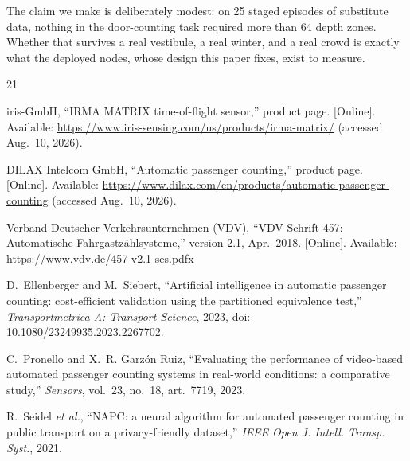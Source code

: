 \documentclass[conference]{IEEEtran}
\begin{document}
The claim we make is deliberately modest: on 25 staged episodes of substitute
data, nothing in the door-counting task required more than 64 depth zones.
Whether that survives a real vestibule, a real winter, and a real crowd is
exactly what the deployed nodes, whose design this paper fixes, exist to
measure.

\begin{thebibliography}{21}

iris-GmbH, ``IRMA MATRIX time-of-flight sensor,'' product page. [Online].
Available: \url{https://www.iris-sensing.com/us/products/irma-matrix/}
(accessed Aug.\ 10, 2026).

DILAX Intelcom GmbH, ``Automatic passenger counting,'' product page. [Online].
Available: \url{https://www.dilax.com/en/products/automatic-passenger-counting}
(accessed Aug.\ 10, 2026).

Verband Deutscher Verkehrsunternehmen (VDV), ``VDV-Schrift 457:
Automatische Fahrgastz\"ahlsysteme,'' version 2.1, Apr.\ 2018. [Online].
Available: \url{https://www.vdv.de/457-v2.1-ses.pdfx}

D.~Ellenberger and M.~Siebert, ``Artificial intelligence in automatic
passenger counting: cost-efficient validation using the partitioned
equivalence test,'' \emph{Transportmetrica A: Transport Science}, 2023,
doi: 10.1080/23249935.2023.2267702.

C.~Pronello and X.~R. Garz\'on Ruiz, ``Evaluating the performance of
video-based automated passenger counting systems in real-world conditions: a
comparative study,'' \emph{Sensors}, vol.~23, no.~18, art.~7719, 2023.

R.~Seidel \emph{et al.}, ``NAPC: a neural algorithm for automated passenger
counting in public transport on a privacy-friendly dataset,'' \emph{IEEE Open
J. Intell. Transp. Syst.}, 2021.


\end{thebibliography}
\end{document}
